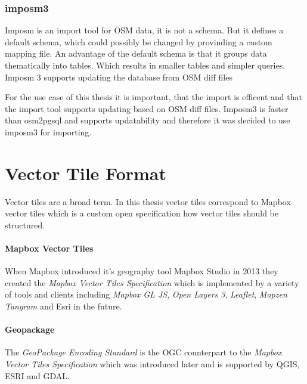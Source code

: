 \subsubsection{imposm3}\label{imposm-importer}

Imposm is an import tool for OSM data, it is not a schema. But it
defines a default
schema\cite{9_imposm.org_2015},
which could possibly be changed by provinding a custom mapping file. An
advantage of the default schema is that it groups data thematically into
tables. Which results in smaller tables and simpler queries. Imposm 3
supports updating the database from OSM diff
files\cite{10_imposm.org_2015}

\begin{tcolorbox}[arc=0mm,boxrule=1pt,title=Decision]\label{osm_import_tool_decision}
For the use case of this thesis it is important, that the import is efficent and that
the import tool supports updating based on OSM diff files. Imposm3 is
faster than osm2pgsql and supports updatability and therefore it was decided to use imposm3 for importing.
\end{tcolorbox}

\section{Vector Tile Format}\label{vector-tile-formats}

Vector tiles are a broad term. In this thesis vector tiles correspond to Mapbox vector tiles which is a custom open specification how vector tiles should be structured.

\paragraph{Mapbox Vector Tiles}

When Mapbox introduced it's geography tool Mapbox Studio in 2013 they
created the \emph{Mapbox Vector Tiles Specification}
\cite{4_github_2015} which is
implemented by a variety of tools and clients
\cite{11_github_2015}
including \emph{Mapbox GL JS}, \emph{Open Layers 3}, \emph{Leaflet},
\emph{Mapzen Tangram} and Esri
\cite{12_springmeyer_2015} in
the future.

\paragraph{Geopackage}

The \emph{GeoPackage Encoding Standard} is the OGC counterpart to the
\emph{Mapbox Vector Tiles Specification} which was introduced later and
is supported by QGIS, ESRI and GDAL.

